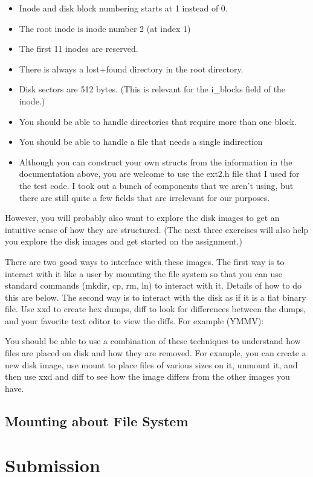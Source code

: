 \documentclass[12pt]{article}
\begin{document}
\begin{itemize}
    \item Inode and disk block numbering starts at 1 instead of 0.
    \item The root inode is inode number 2 (at index 1)
    \item The first 11 inodes are reserved.
    \item There is always a lost+found directory in the root directory.
    \item Disk sectors are 512 bytes. (This is relevant for the i\_blocks field of the inode.)
    \item You should be able to handle directories that require more than one block.
    \item You should be able to handle a file that needs a single indirection
    \item Although you can construct your own structs from the information in the documentation above, you are welcome to use the ext2.h file that I used for the test code. I took out a bunch of components that we aren't using, but there are still quite a few fields that are irrelevant for our purposes.
\end{itemize}

\bigskip

However, you will probably also want to explore the disk images to get an intuitive sense of how they are structured. (The next three exercises will also help you explore the disk images and get started on the assignment.)

There are two good ways to interface with these images. The first way is to interact with it like a user by mounting the file system so that you can use standard commands (mkdir, cp, rm, ln) to interact with it. Details of how to do this are below. The second way is to interact with the disk as if it is a flat binary file. Use xxd to create hex dumps, diff to look for differences between the dumps, and your favorite text editor to view the diffs. For example (YMMV):

You should be able to use a combination of these techniques to understand how files are placed on disk and how they are removed. For example, you can create a new disk image, use mount to place files of various sizes on it, unmount it, and then use xxd and diff to see how the image differs from the other images you have.


\bigskip

\subsection{Mounting about File System}

\bigskip

\section{Submission}
\end{document}
